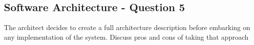 
\subsection{Software Architecture - Question 5}

\begin{question}
The architect decides to create a full architecture
description before embarking on any implementation of the
system. Discuss pros and cons of taking that approach
\end{question}

